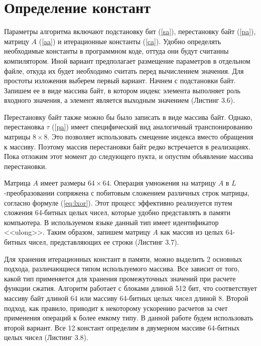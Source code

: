 \section{Определение констант}
\par
Параметры алгоритма включают подстановку бит (\ref{sa}), перестановку байт (\ref{pa}), матрицу $A$ (\ref{aa}) и итерационные константы (\ref{ca}). Удобно определять необходимые константы в программном коде, оттуда они будут считанны компилятором. Иной вариант предполагает размещение параметров в отдельном файле, откуда их будет необходимо считать перед вычислением значения. Для простоты изложения выберем первый вариант. Начнем с подстановки байт. Запишем ее в виде массива байт, в котором индекс элемента выполняет роль входного значения, а элемент является выходным значением (Листинг 3.6). 

\par
Перестановку байт также можно бы было записать в виде массива байт. Однако, перестановка $\tau$ (\ref{pa}) имеет специфический вид аналогичный транспонированию матрицы $8\times 8$. Это позволяет использовать смещение индекса вместо обращения к массиву. Поэтому массив перестановки байт редко встречается в реализациях. Пока отложим этот момент до следующего пукта, и опустим объявление массива перестановки.
\par
Матрица $A$ имеет размеры $64\times 64$. Операция умножения на матрицу $A$ в $L$-преобразовании сопряжена с побитовым сложением различных строк матрицы, согласно формуле (\ref{eq:lxor}). Этот процесс эффективно реализуется путем сложения 64-битных целых чисел, которые удобно представлять в памяти компьютера. В используемом языке данный тип имеет идентификатор <<ulong>>. Таким образом, запишем матрицу $A$ как массив из целых 64-битных чисел, представляющих ее строки (Листинг 3.7).

\par
Для хранения итерационных констант в памяти, можно выделить 2 основных подхода, различающиеся типом используемого массива. Все зависит от того, какой тип применяется для хранения промежуточных значений при расчете функции сжатия. Алгоритм работает с блоками длиной 512 бит, что соответствует массиву байт длиной 64 или массиву 64-битных целых чисел длиной 8. Второй подход, как правило, приводит к некоторому ускорению расчетов за счет применения операций к более емкому типу. В данной работе будем использовать второй вариант. Все 12 констант определим в двумерном массиве 64-битных целых чисел (Листинг 3.8).

